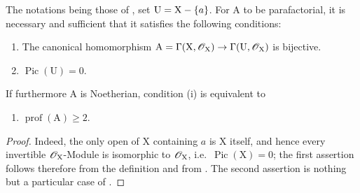 \begin{proposition}[21.13.8]
\label{IV.21.13.8}
The notations being those of , set $\mathrm{U}=\mathrm{X}-\{a\}$.
For $\mathrm{A}$ to be parafactorial, it is necessary and sufficient that it satisfies the following conditions:
\begin{enumerate}[label=\textup{(\roman*)}]
  \item The canonical homomorphism $\mathrm{A}=\Gamma(\mathrm{X},\mathscr{O}_{\mathrm{X}})\to\Gamma(\mathrm{U},\mathscr{O}_{\mathrm{X}})$ is bijective.
  \item $\operatorname{Pic}(\mathrm{U})=0$.
\end{enumerate}

If furthermore $\mathrm{A}$ is Noetherian, condition \textup{(i)} is equivalent to
\begin{enumerate}
  \item[\textup{(i \emph{bis})}] $\operatorname{prof}(\mathrm{A})\geq 2$.
\end{enumerate}
\end{proposition}

\begin{proof}
Indeed, the only open of $\mathrm{X}$ containing $a$ is $\mathrm{X}$ itself, and hence every invertible $\mathscr{O}_{\mathrm{X}}$-Module is isomorphic to $\mathscr{O}_{\mathrm{X}}$, i.e.\ $\operatorname{Pic}(\mathrm{X})=0$; the first assertion follows therefore from the definition  and from .
The second assertion is nothing but a particular case of .
\end{proof}

